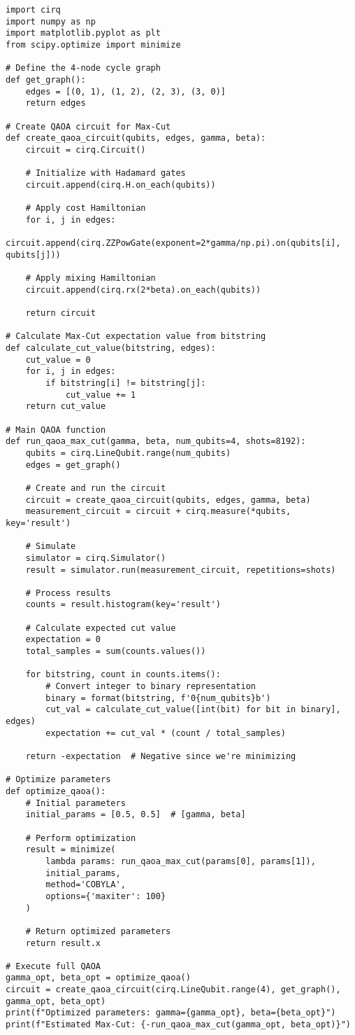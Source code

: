 \begin{verbatim}
import cirq
import numpy as np
import matplotlib.pyplot as plt
from scipy.optimize import minimize

# Define the 4-node cycle graph
def get_graph():
    edges = [(0, 1), (1, 2), (2, 3), (3, 0)]
    return edges

# Create QAOA circuit for Max-Cut
def create_qaoa_circuit(qubits, edges, gamma, beta):
    circuit = cirq.Circuit()

    # Initialize with Hadamard gates
    circuit.append(cirq.H.on_each(qubits))

    # Apply cost Hamiltonian
    for i, j in edges:
        circuit.append(cirq.ZZPowGate(exponent=2*gamma/np.pi).on(qubits[i], qubits[j]))

    # Apply mixing Hamiltonian
    circuit.append(cirq.rx(2*beta).on_each(qubits))

    return circuit

# Calculate Max-Cut expectation value from bitstring
def calculate_cut_value(bitstring, edges):
    cut_value = 0
    for i, j in edges:
        if bitstring[i] != bitstring[j]:
            cut_value += 1
    return cut_value

# Main QAOA function
def run_qaoa_max_cut(gamma, beta, num_qubits=4, shots=8192):
    qubits = cirq.LineQubit.range(num_qubits)
    edges = get_graph()

    # Create and run the circuit
    circuit = create_qaoa_circuit(qubits, edges, gamma, beta)
    measurement_circuit = circuit + cirq.measure(*qubits, key='result')

    # Simulate
    simulator = cirq.Simulator()
    result = simulator.run(measurement_circuit, repetitions=shots)

    # Process results
    counts = result.histogram(key='result')

    # Calculate expected cut value
    expectation = 0
    total_samples = sum(counts.values())

    for bitstring, count in counts.items():
        # Convert integer to binary representation
        binary = format(bitstring, f'0{num_qubits}b')
        cut_val = calculate_cut_value([int(bit) for bit in binary], edges)
        expectation += cut_val * (count / total_samples)

    return -expectation  # Negative since we're minimizing

# Optimize parameters
def optimize_qaoa():
    # Initial parameters
    initial_params = [0.5, 0.5]  # [gamma, beta]

    # Perform optimization
    result = minimize(
        lambda params: run_qaoa_max_cut(params[0], params[1]),
        initial_params,
        method='COBYLA',
        options={'maxiter': 100}
    )

    # Return optimized parameters
    return result.x

# Execute full QAOA
gamma_opt, beta_opt = optimize_qaoa()
circuit = create_qaoa_circuit(cirq.LineQubit.range(4), get_graph(), gamma_opt, beta_opt)
print(f"Optimized parameters: gamma={gamma_opt}, beta={beta_opt}")
print(f"Estimated Max-Cut: {-run_qaoa_max_cut(gamma_opt, beta_opt)}")
\end{verbatim}

